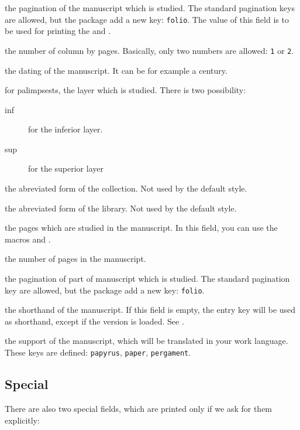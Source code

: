 \documentclass{ltxdockit}[2011/03/25]
\begin{document}
\begin{fieldlist}

 the pagination of the manuscript which is studied. The standard pagination keys are allowed, but the package add a new key: \texttt{folio}. The value of this field is to be used for printing the  and .

 the number of column by pages. Basically, only two numbers are allowed: \verb+1+ or \verb+2+.

 the dating of the manuscript. It can be for example a century.

 for palimpsests, the layer which is studied. There is two possibility: 
	\begin{description}
		\item[inf] for the inferior layer.
		\item[sup] for the superior layer 
	\end{description}

 the abreviated form of the collection. Not used by the default style.\label{field:shortcollection}


 the abreviated form of the library. Not used by the default style.


 the pages which are studied in the manuscript. In this field, you can use the macros  and .

 the number of pages in the manuscript.


 the pagination of part of manuscript which is studied. The standard pagination key are allowed, but the package add a new key: \verb+folio+.


 the shorthand of the manuscript. If this field is empty, the entry key will be used as shorthand, except if the version  is loaded. See .

 the support of the manuscript, which will be translated in your work language. These keys are defined: \texttt{papyrus}, \texttt{paper}, \texttt{pergament}.

\end{fieldlist}

\subsection{Special}\label{fields:special}
There are also two special fields, which are printed only if we ask for them explicitly:
\end{document}
